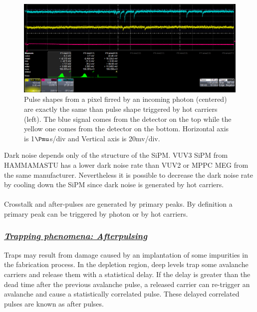 \documentclass[a4paper, 11pt]{report}%
\begin{document}
  \begin{figure}[!hbtp]
  \centering
    \includegraphics[totalheight=0.2\textwidth,trim=0.3cm 6.6cm 0.1cm 0cm, clip=true]{../Pictures/Pictures_oscilloscope/DN_photon.png}
    \caption{Pulse shapes from a pixel firred by an incoming photon (centered) are exactly the same than pulse shape triggered by hot carriers (left).
    The blue signal comes from the detector on the top while the yellow one comes from the detector on the bottom.
    Horizontal axis is 1$\Pmu$s/div and Vertical axis is 20mv/div.}
    \label{fig:DN_photon}
  \end{figure}
  
  Dark noise depends only of the structure of the SiPM. VUV3 SiPM from HAMMAMASTU has a lower dark noise rate than VUV2 or MPPC MEG 
  from the same manufacturer.
  Nevertheless it is possible to decrease the dark noise rate by cooling down the SiPM since dark noise is generated by 
  hot carriers.  
  \\
  \\
  
  Crosstalk and after-pulses are generated by primary peaks. By definition a primary peak can be triggered by photon or by hot carriers. 
  
  \subsubsection{\textit{\underline{Trapping phenomena: Afterpulsing}}}\label{subsubsec:AP_section}

  Traps may result from damage caused by an implantation of some impurities in the fabrication process. In the depletion region, 
  deep levels trap some avalanche carriers and release them with 
  a statistical delay. If the delay is greater than the dead time after the previous avalanche pulse, a released carrier can
  re-trigger an avalanche and cause a statistically correlated pulse. These delayed correlated pulses are known as after pulses. 
  
\end{document}
